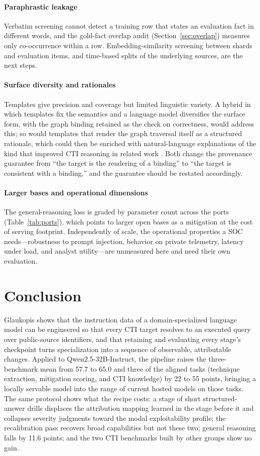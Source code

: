 \documentclass[a4paper,fleqn]{cas-dc}
\begin{document}
\paragraph{Paraphrastic leakage}
Verbatim screening cannot detect a training row that states an evaluation fact in different words, and the gold-fact overlap audit (Section~\ref{sec:overlap}) measures only co-occurrence within a row. Embedding-similarity screening between shards and evaluation items, and time-based splits of the underlying sources, are the next steps.

\paragraph{Surface diversity and rationales}
Templates give precision and coverage but limited linguistic variety. A hybrid in which templates fix the semantics and a language model diversifies the surface form, with the graph binding retained as the check on correctness, would address this; so would templates that render the graph traversal itself as a structured rationale, which could then be enriched with natural-language explanations of the kind that improved CTI reasoning in related work \citep{levi2025toward}. Both change the provenance guarantee from ``the target is the rendering of a binding'' to ``the target is consistent with a binding,'' and the guarantee should be restated accordingly.

\paragraph{Larger bases and operational dimensions}
The general-reasoning loss is graded by parameter count across the ports (Table~\ref{tab:ports}), which points to larger open bases as a mitigation at the cost of serving footprint. Independently of scale, the operational properties a SOC needs---robustness to prompt injection, behavior on private telemetry, latency under load, and analyst utility---are unmeasured here and need their own evaluation.

\section{Conclusion}\label{sec:conclusion}
Glaukopis shows that the instruction data of a domain-specialized language model can be engineered so that every CTI target resolves to an executed query over public-source identifiers, and that retaining and evaluating every stage's checkpoint turns specialization into a sequence of observable, attributable changes. Applied to Qwen2.5-32B-Instruct, the pipeline raises the three-benchmark mean from 57.7 to 65.0 and three of the aligned tasks (technique extraction, mitigation scoring, and CTI knowledge) by 22 to 55 points, bringing a locally servable model into the range of current hosted models on those tasks. The same protocol shows what the recipe costs: a stage of short structured-answer drills displaces the attribution mapping learned in the stage before it and collapses severity judgments toward the modal exploitability profile; the recalibration pass recovers broad capabilities but not these two; general reasoning falls by 11.6 points; and the two CTI benchmarks built by other groups show no gain.
\end{document}
